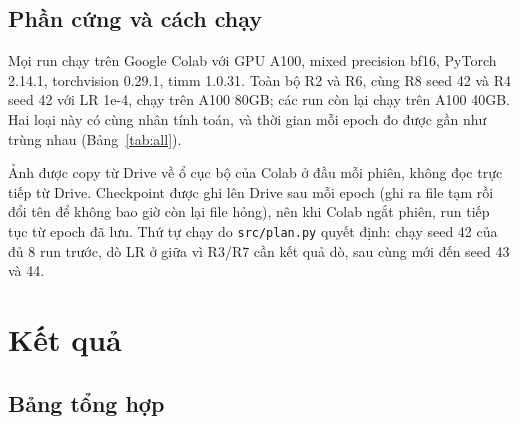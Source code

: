 \documentclass[12pt,a4paper]{article}
\begin{document}
\subsection{Phần cứng và cách chạy}

Mọi run chạy trên Google Colab với GPU A100, mixed precision bf16, PyTorch 2.14.1,
torchvision 0.29.1, timm 1.0.31. Toàn bộ R2 và R6, cùng R8 seed 42 và R4 seed 42
với LR 1e-4, chạy trên A100 80GB; các run còn lại chạy trên A100 40GB. Hai loại này có cùng
nhân tính toán, và thời gian mỗi epoch đo được gần như trùng nhau (Bảng~\ref{tab:all}).

Ảnh được copy từ Drive về ổ cục bộ của Colab ở đầu mỗi phiên, không đọc trực tiếp từ
Drive. Checkpoint được ghi lên Drive sau mỗi epoch (ghi ra file tạm rồi đổi tên để
không bao giờ còn lại file hỏng), nên khi Colab ngắt phiên, run tiếp tục từ epoch đã
lưu. Thứ tự chạy do \texttt{src/plan.py} quyết định: chạy seed 42 của đủ 8 run trước,
dò LR ở giữa vì R3/R7 cần kết quả dò, sau cùng mới đến seed 43 và 44.

\section{Kết quả}

\subsection{Bảng tổng hợp}
\end{document}
